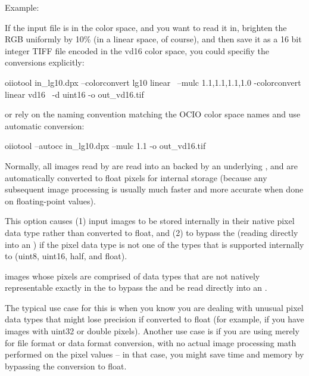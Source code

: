 \noindent Example:

If the input file  is in the  color space,
and you want to read it in, brighten the RGB uniformly by 10\% (in a linear
space, of course), and then save it as a 16 bit integer TIFF file encoded
in the {\cf vd16} color space, you could specifiy the conversions
explicitly:

\begin{code}
  oiiotool in_lg10.dpx --colorconvert lg10 linear \
                       --mulc 1.1,1.1,1.1,1.0 -colorconvert linear vd16 \
                       -d uint16 -o out_vd16.tif
\end{code}

\noindent or rely on the naming convention matching the OCIO color space
names and use automatic conversion:

\begin{code}
  oiiotool --autocc in_lg10.dpx --mulc 1.1 -o out_vd16.tif
\end{code}

\apiend

Normally, all images read by \oiiotool are read into an \ImageBuf backed by
an underlying \ImageCache, and are automatically converted to {\cf float}
pixels for internal storage (because any subsequent image processing is
usually much faster and more accurate when done on floating-point values).

This option causes (1) input images to be stored internally in their native
pixel data type rather than converted to float, and (2) to bypass the
\ImageCache (reading directly into an \ImageBuf) if the pixel data type is
not one of the types that is supported internally to \ImageCache ({\cf uint8},
{\cf uint16}, {\cf half}, and {\cf float}).

images whose pixels are comprised of data types that
are not natively representable exactly in the \ImageCache to bypass the
\ImageCache and be read directly into an \ImageBuf.

The typical use case for this is when you know you are dealing with unusual
pixel data types that might lose precision if converted to {\cf float} (for
example, if you have images with {\cf uint32} or {\cf double} pixels).
Another use case is if you are using \oiiotool merely for file format or
data format conversion, with no actual image processing math performed on
the pixel values -- in that case, you might save time and memory by
bypassing the conversion to {\cf float}.
\apiend

